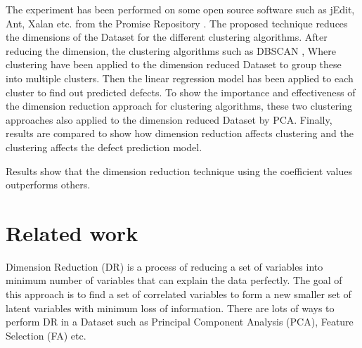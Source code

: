 \documentclass[12pt]{report}
\begin{document}
The experiment has been performed on some open source software such as jEdit, Ant, Xalan etc. from the Promise Repository \cite{promise12}. The proposed technique reduces the dimensions of the Dataset for the different clustering algorithms. After reducing the dimension, the clustering algorithms such as DBSCAN \cite{ester1996density}, Where clustering \cite{menzies2011local,menzies2013local} have been applied to the dimension reduced Dataset to group these into multiple clusters. Then the linear regression model has been applied to each cluster to find out predicted defects. To show the importance and effectiveness of the dimension reduction approach for clustering algorithms, these two clustering approaches also applied to the dimension reduced Dataset by PCA. Finally, results are compared to show how dimension reduction affects clustering and the clustering affects the defect prediction model.


Results show that the dimension reduction technique using the coefficient values outperforms others. 



\section{Related work}


Dimension Reduction (DR) is a process of reducing a set of variables into minimum number of variables that can explain the data perfectly. The goal of this approach is to find a set of correlated variables to form a new smaller set of latent variables with minimum loss of information. There are lots of ways to perform DR in a Dataset such as Principal Component Analysis (PCA), Feature Selection (FA) etc.
\end{document}
